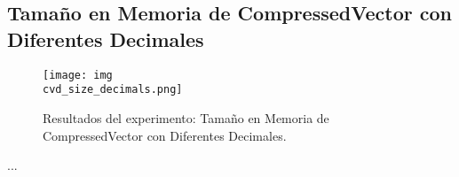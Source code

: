 \subsection{Tamaño en Memoria de CompressedVector con Diferentes Decimales}
\label{exp:cvd-size-decimals}

\begin{figure}[H]
    \centering
    \texttt{[image: img\\cvd\_size\_decimals.png]}
    \caption{Resultados del experimento: Tamaño en Memoria de CompressedVector con Diferentes Decimales.}
    \label{fig:cvd-size-decimals}
\end{figure}

...
